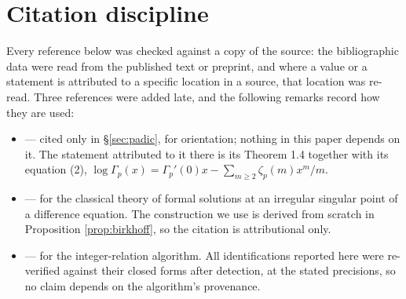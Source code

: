\documentclass[11pt,reqno]{amsart}
\theoremstyle{plain}
\theoremstyle{definition}
\theoremstyle{remark}
\begin{document}
\section{Citation discipline}\label{app:cites}

Every reference below was checked against a copy of the source: the bibliographic data were read
from the published text or preprint, and where a value or a statement is attributed to a specific
location in a source, that location was re-read. Three references were added late, and the
following remarks record how they are used:
\begin{itemize}[leftmargin=1.6em]
\item \cite{BeVl25} --- cited only in \S\ref{sec:padic}, for orientation; nothing in this paper
depends on it. The statement attributed to it there is its Theorem 1.4 together with its
equation (2), $\log\Gamma_p(x)=\Gamma_p'(0)x-\sum_{m\ge2}\zeta_p(m)x^m/m$.
\item \cite{BT33} --- for the classical theory of formal solutions at an irregular
singular point of a difference equation. The construction we use is derived from scratch in
Proposition \ref{prop:birkhoff}, so the citation is attributional only.
\item \cite{FBA99} --- for the integer-relation algorithm. All identifications reported
here were re-verified against their closed forms after detection, at the stated precisions, so no
claim depends on the algorithm's provenance.
\end{itemize}
\end{document}
